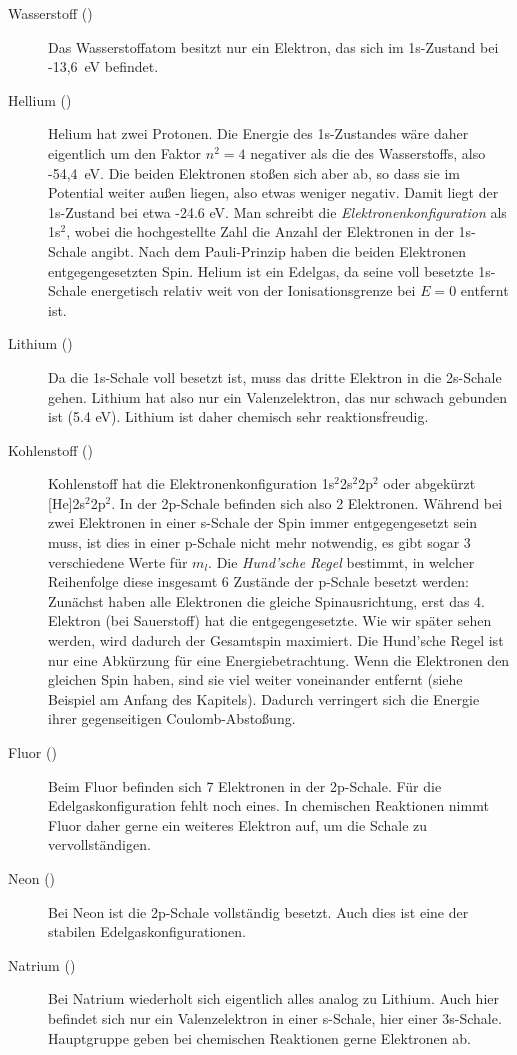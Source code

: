 \begin{description}
    \item[Wasserstoff ()] Das Wasserstoffatom besitzt nur ein Elektron, das sich im 1s-Zustand bei -13,6~eV befindet.
  
  \item[Hellium ()] Helium hat zwei Protonen. Die Energie des 1s-Zustandes wäre daher eigentlich um den Faktor $n^2 = 4$ negativer als die des Wasserstoffs, also -54,4~eV. Die beiden Elektronen stoßen sich aber ab, so dass sie im Potential weiter außen liegen, also etwas weniger negativ. Damit liegt der 1s-Zustand bei etwa -24.6 eV. Man schreibt die \emph{Elektronenkonfiguration} als 1s$^2$, wobei die hochgestellte Zahl die Anzahl der Elektronen in der 1s-Schale angibt. Nach dem Pauli-Prinzip haben die beiden Elektronen entgegengesetzten Spin. Helium ist ein Edelgas, da seine voll besetzte 1s-Schale energetisch relativ weit von der Ionisationsgrenze bei $E=0$ entfernt ist.
   
    \item[Lithium ()] Da die 1s-Schale voll besetzt ist, muss das dritte Elektron in die 2s-Schale gehen. Lithium hat also nur ein Valenzelektron, das nur schwach gebunden ist (5.4 eV). Lithium ist daher chemisch sehr reaktionsfreudig.
    
    \item[Kohlenstoff ()]   Kohlenstoff hat die Elektronenkonfiguration 1s$^2$2s$^2$2p$^2$ oder abgekürzt [He]2s$^2$2p$^2$. In der 2p-Schale befinden sich also 2 Elektronen. Während bei zwei Elektronen in einer s-Schale der Spin immer entgegengesetzt sein muss, ist dies in einer p-Schale nicht mehr notwendig, es gibt sogar 3 verschiedene Werte für $m_l$. Die \emph{Hund'sche Regel} bestimmt, in welcher Reihenfolge diese insgesamt 6 Zustände der p-Schale besetzt werden: Zunächst haben alle Elektronen die gleiche Spinausrichtung, erst das 4. Elektron (bei Sauerstoff) hat die entgegengesetzte. Wie wir später sehen werden, wird dadurch der Gesamtspin maximiert. Die Hund'sche Regel ist nur eine Abkürzung für eine Energiebetrachtung. Wenn die Elektronen den gleichen Spin haben, sind sie viel weiter voneinander entfernt (siehe Beispiel am Anfang des Kapitels). Dadurch verringert sich die Energie ihrer gegenseitigen Coulomb-Abstoßung.
    
    \item[Fluor ()] Beim Fluor befinden sich 7 Elektronen in der 2p-Schale. Für die Edelgaskonfiguration fehlt noch eines. In chemischen Reaktionen nimmt Fluor daher gerne ein weiteres Elektron auf, um die Schale zu vervollständigen.

    \item[Neon ()]  Bei Neon ist die 2p-Schale vollständig besetzt. Auch dies ist eine der stabilen Edelgaskonfigurationen.
    
    \item[Natrium ()] Bei Natrium wiederholt sich eigentlich alles analog zu Lithium. Auch hier befindet sich nur ein Valenzelektron in einer s-Schale, hier einer 3s-Schale. Hauptgruppe geben bei chemischen Reaktionen gerne Elektronen ab.
\end{description}

